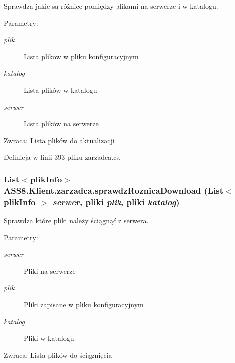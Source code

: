 Sprawdza jakie są różnice pomiędzy plikami na serwerze i w katalogu. 

\begin{Desc}
\item[Parametry:]
\begin{description}
\item[{\em plik}]Lista plikow w pliku konfiguracyjnym\item[{\em katalog}]Lista plików w katalogu\item[{\em serwer}]Lista plików na serwerze\end{description}
\end{Desc}
\begin{Desc}
\item[Zwraca:]Lista plików do aktualizacji\end{Desc}


Definicja w linii 393 pliku zarzadca.cs.\hypertarget{a00037_55b06ff6e65c5b3668ddd5e299528beb}{
\subsubsection[{sprawdzRoznicaDownload}]{\setlength{\rightskip}{0pt plus 5cm}List$<${\bf plikInfo}$>$ ASS8.Klient.zarzadca.sprawdzRoznicaDownload (List$<$ {\bf plikInfo} $>$ {\em serwer}, \/  {\bf pliki} {\em plik}, \/  {\bf pliki} {\em katalog})}}
\label{d1/dc6/a00037_55b06ff6e65c5b3668ddd5e299528beb}


Sprawdza które \hyperlink{a00017}{pliki} należy ściągnąć z serwera. 

\begin{Desc}
\item[Parametry:]
\begin{description}
\item[{\em serwer}]Pliki na serwerze\item[{\em plik}]Pliki zapisane w pliku konfiguracyjnym\item[{\em katalog}]Pliki w katalogu\end{description}
\end{Desc}
\begin{Desc}
\item[Zwraca:]Lista plików do ściągnięcia\end{Desc}


